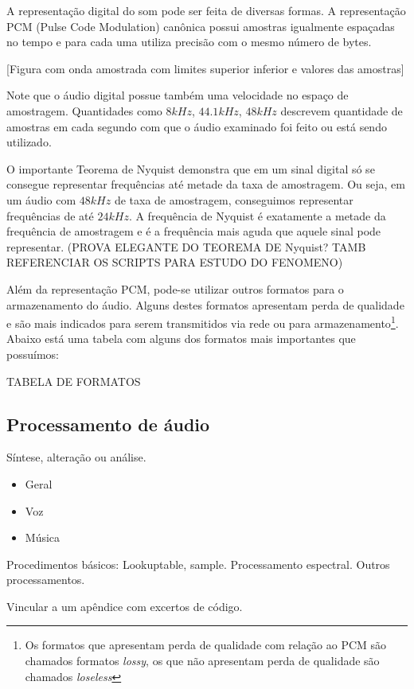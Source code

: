 A representação digital do som pode ser feita de diversas formas.
A representação PCM (Pulse Code Modulation) canônica possui amostras
igualmente espaçadas no tempo e para cada uma utiliza precisão com o mesmo
número de bytes.

[Figura com onda amostrada com limites superior inferior e valores das amostras]

Note que o áudio digital possue também uma velocidade no espaço de amostragem.
Quantidades como $8kHz$, $44.1kHz$, $48kHz$
descrevem quantidade de amostras em cada segundo com que o áudio examinado foi feito ou
está sendo utilizado.

O importante Teorema de Nyquist demonstra que em um sinal digital só se consegue representar
frequências até metade da taxa de amostragem. Ou seja, em um áudio com $48kHz$ de taxa de amostragem,
conseguimos representar frequências de até $24kHz$. A frequência de Nyquist é exatamente a metade
da frequência de amostragem e é a frequência mais aguda que aquele sinal pode representar.
(PROVA ELEGANTE DO TEOREMA DE Nyquist? TAMB REFERENCIAR OS SCRIPTS PARA ESTUDO DO FENOMENO)

Além da representação PCM, pode-se utilizar outros formatos para o armazenamento do áudio. Alguns
destes formatos apresentam perda de qualidade e são mais indicados para serem transmitidos via rede ou
para armazenamento\footnote{Os formatos que apresentam perda de qualidade com relação
ao PCM são chamados formatos \emph{lossy}, os que não apresentam perda de qualidade
são chamados \emph{loseless}}. Abaixo está uma tabela com alguns dos formatos mais importantes que possuímos:

TABELA DE FORMATOS


\subsection{Processamento de áudio}

Síntese, alteração ou análise.

\begin{itemize}
    \item Geral
    \item Voz
    \item Música
\end{itemize}

Procedimentos básicos: Lookuptable, sample. Processamento
espectral. Outros processamentos.

Vincular a um apêndice com excertos de código.

